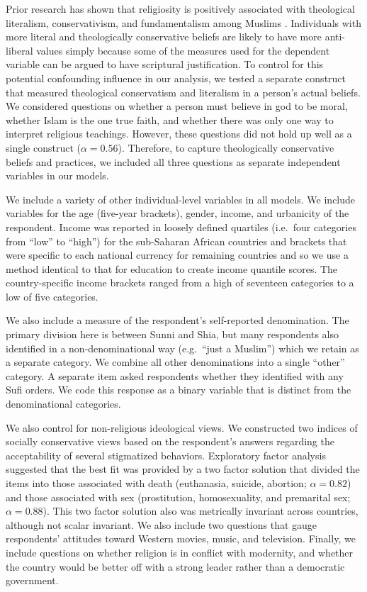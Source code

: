 \documentclass[10pt,letterpaper]{article}
\begin{document}
Prior research has shown that religiosity is positively associated with theological literalism, conservativism, and fundamentalism among Muslims \cite{moaddel_religious_2018}. Individuals with more literal and theologically conservative beliefs are likely to have more anti-liberal values simply because some of the measures used for the dependent variable can be argued to have scriptural justification. To control for this potential confounding influence in our analysis, we tested a separate construct that measured theological conservatism and literalism in a person's actual beliefs. We considered questions on whether a person must believe in god to be moral, whether Islam is the one true faith, and whether there was only one way to interpret religious teachings. However, these questions did not hold up well as a single construct (\(\alpha=0.56\)). Therefore, to capture theologically conservative beliefs and practices, we included all three questions as separate independent variables in our models.

We include a variety of other individual-level variables in all models. We include variables for the age (five-year brackets), gender, income, and urbanicity of the respondent. Income was reported in loosely defined quartiles (i.e.~four categories from ``low'' to ``high'') for the sub-Saharan African countries and brackets that were specific to each national currency for remaining countries and so we use a method identical to that for education to create income quantile scores. The country-specific income brackets ranged from a high of seventeen categories to a low of five categories.

We also include a measure of the respondent's self-reported denomination. The primary division here is between Sunni and Shia, but many respondents also identified in a non-denominational way (e.g.~``just a Muslim'') which we retain as a separate category. We combine all other denominations into a single ``other'' category. A separate item asked respondents whether they identified with any Sufi orders. We code this response as a binary variable that is distinct from the denominational categories.

We also control for non-religious ideological views. We constructed two indices of socially conservative views based on the respondent's answers regarding the acceptability of several stigmatized behaviors. Exploratory factor analysis suggested that the best fit was provided by a two factor solution that divided the items into those associated with death (euthanasia, suicide, abortion; \(\alpha=0.82\)) and those associated with sex (prostitution, homosexuality, and premarital sex; \(\alpha=0.88\)). This two factor solution also was metrically invariant across countries, although not scalar invariant. We also include two questions that gauge respondents' attitudes toward Western movies, music, and television. Finally, we include questions on whether religion is in conflict with modernity, and whether the country would be better off with a strong leader rather than a democratic government.
\end{document}
